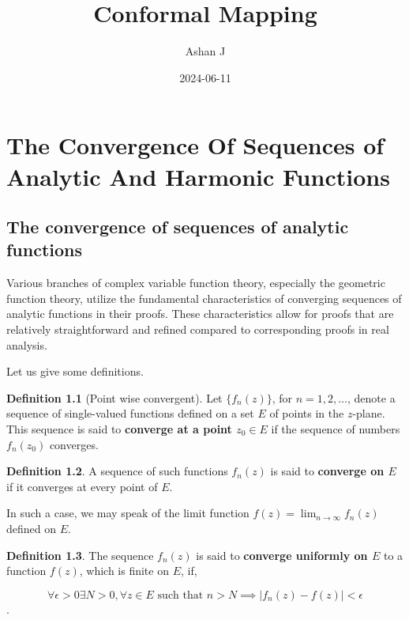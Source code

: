 \documentclass[
]{book}
\title{Conformal Mapping}
\author{Ashan J}
\date{2024-06-11}
\theoremstyle{definition}
\newtheorem{definition}{Definition}[chapter]
\theoremstyle{definition}
\theoremstyle{definition}
\theoremstyle{definition}
\theoremstyle{remark}
\begin{document}
\maketitle

{
\setcounter{tocdepth}{1}
\tableofcontents
}
\chapter{The Convergence Of Sequences of Analytic And Harmonic Functions}\label{the-convergence-of-sequences-of-analytic-and-harmonic-functions}

\section{The convergence of sequences of analytic functions}\label{the-convergence-of-sequences-of-analytic-functions}

Various branches of complex variable function theory, especially the geometric function theory, utilize the fundamental characteristics of converging sequences of analytic functions in their proofs. These characteristics allow for proofs that are relatively straightforward and refined compared to corresponding proofs in real analysis.

Let us give some definitions.

\begin{definition}[Point wise convergent]
\protect\hypertarget{def:unnamed-chunk-1}{}\label{def:unnamed-chunk-1}Let \(\{f_n (z)\}\), for \(n = 1, 2, \ldots\), denote a sequence of single-valued functions defined on a set \(E\) of points in the \(z\)-plane.
This sequence is said to \textbf{converge at a point \(z_0 \in E\)} if the sequence of numbers \(f_n (z_0)\) converges.
\end{definition}

\begin{definition}
\protect\hypertarget{def:unnamed-chunk-2}{}\label{def:unnamed-chunk-2}A sequence of such functions \(f_n (z)\) is said to \textbf{converge on \(E\)} if it converges at every point of \(E\).

In such a case, we may speak of the limit function \(f(z) = \lim_{n\to\infty} f_n (z)\) defined on \(E\).
\end{definition}

\begin{definition}
\protect\hypertarget{def:unnamed-chunk-3}{}\label{def:unnamed-chunk-3}The sequence \({f_n (z)}\) is said to \textbf{converge uniformly on \(E\)} to a function \(f(z)\), which is finite on \(E\), if,

\[\forall \epsilon > 0 \exists N > 0 , \forall z \in E \text{ such that } n > N \implies |f_n (z) - f(z)| < \epsilon \].
\end{definition}
\end{document}
